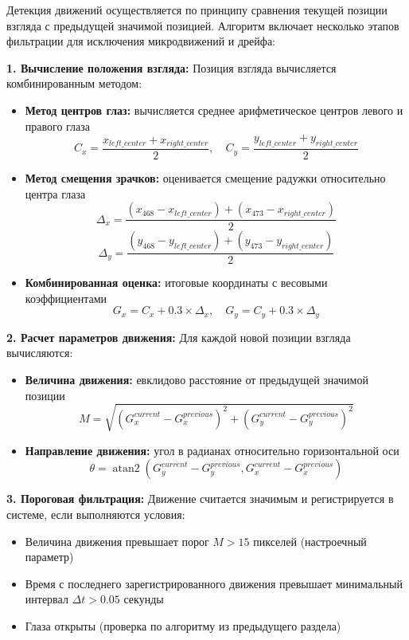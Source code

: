 \documentclass[14pt, a4paper]{extreport}
\begin{document}
Детекция движений осуществляется по принципу сравнения текущей позиции взгляда с предыдущей значимой позицией. Алгоритм включает несколько этапов фильтрации для исключения микродвижений и дрейфа:

\textbf{1. Вычисление положения взгляда:}
Позиция взгляда вычисляется комбинированным методом:
\begin{itemize}
    \item \textbf{Метод центров глаз:} вычисляется среднее арифметическое центров левого и правого глаза
    $$C_x = \frac{x_{left\_center} + x_{right\_center}}{2}, \quad C_y = \frac{y_{left\_center} + y_{right\_center}}{2}$$
    
    \item \textbf{Метод смещения зрачков:} оценивается смещение радужки относительно центра глаза
    $$\Delta_x = \frac{(x_{468} - x_{left\_center}) + (x_{473} - x_{right\_center})}{2}$$
    $$\Delta_y = \frac{(y_{468} - y_{left\_center}) + (y_{473} - y_{right\_center})}{2}$$
    
    \item \textbf{Комбинированная оценка:} итоговые координаты с весовыми коэффициентами
    $$G_x = C_x + 0.3 \times \Delta_x, \quad G_y = C_y + 0.3 \times \Delta_y$$
\end{itemize}

\textbf{2. Расчет параметров движения:}
Для каждой новой позиции взгляда вычисляются:
\begin{itemize}
    \item \textbf{Величина движения:} евклидово расстояние от предыдущей значимой позиции
    $$M = \sqrt{(G_x^{current} - G_x^{previous})^2 + (G_y^{current} - G_y^{previous})^2}$$
    
    \item \textbf{Направление движения:} угол в радианах относительно горизонтальной оси
    $$\theta = \operatorname{atan2}(G_y^{current} - G_y^{previous}, G_x^{current} - G_x^{previous})$$
\end{itemize}

\textbf{3. Пороговая фильтрация:}
Движение считается значимым и регистрируется в системе, если выполняются условия:
\begin{itemize}
    \item Величина движения превышает порог $M > 15$ пикселей (настроечный параметр)
    \item Время с последнего зарегистрированного движения превышает минимальный интервал $\Delta t > 0.05$ секунды
    \item Глаза открыты (проверка по алгоритму из предыдущего раздела)
\end{itemize}
\end{document}
